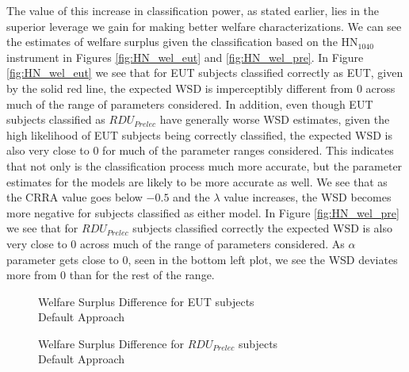 \documentclass[../main.tex]{subfiles}
\begin{document}
The value of this increase in classification power, as stated earlier, lies in the superior leverage we gain for making better welfare characterizations.
We can see the estimates of welfare surplus given the classification based on the $\text{HN}_{1040}$ instrument in Figures \ref{fig:HN_wel_eut} and \ref{fig:HN_wel_pre}.
In Figure \ref{fig:HN_wel_eut} we see that for EUT subjects classified correctly as EUT, given by the solid red line, the expected WSD is imperceptibly different from 0 across much of the range of parameters considered.
In addition, even though EUT subjects classified as $\mathit{RDU_{Prelec}}$ have generally worse WSD estimates, given the high likelihood of EUT subjects being correctly classified, the expected WSD is also very close to 0 for much of the parameter ranges considered.
This indicates that not only is the classification process much more accurate, but the parameter estimates for the models are likely to be more accurate as well.
We see that as the CRRA value goes below $-0.5$ and the $\lambda$ value increases, the WSD becomes more negative for subjects classified as either model.
In Figure \ref{fig:HN_wel_pre} we see that for $\mathit{RDU_{Prelec}}$ subjects classified correctly the expected WSD is also very close to 0 across much of the range of parameters considered.
As $\alpha$ parameter gets close to 0, seen in the bottom left plot, we see the WSD deviates more from 0 than for the rest of the range. 

\begin{figure}[h!]
	\center
	\caption{Welfare Surplus Difference for EUT subjects\\Default Approach}
	\label{fig:HN1_def_wel_eut}
\end{figure}

\begin{figure}[h!]
	\center
	\caption{Welfare Surplus Difference for $\mathit{RDU_{Prelec}}$ subjects\\Default Approach}
	\label{fig:HN1_def_wel_pre}
\end{figure}
\end{document}

